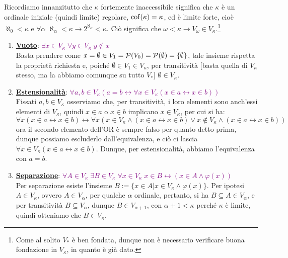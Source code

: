 \begin{soln}
	Ricordiamo innanzitutto che $\kappa$ fortemente inaccessibile significa che $\kappa$ è un ordinale iniziale (quindi limite) regolare, $\operatorname{cof}(\kappa) = \kappa$, ed è limite forte, cioè $\aleph_0 < \kappa$ e $\forall \alpha \; \aleph_\alpha < \kappa \to 2^{\aleph_\alpha} < \kappa$. Ciò significa che $\omega < \kappa \to V_\omega \in V_\kappa$.\footnote{Come al solito $V_*$ è ben fondata, dunque non è necessario verificare buona fondazione in $V_\kappa$, in quanto è già dato.}
	\begin{enumerate}[(1)]
		\item \textbf{\underline{Vuoto}}: \textcolor{purple}{$\exists x \in V_\kappa \; \forall y \in V_\kappa \; y \not \in x$} \\
		Basta prendere come $x = \emptyset \in V_1 = \mathcal{P}(V_0) = \mathcal{P}(\emptyset) = \{\emptyset\}$, tale insieme rispetta la proprietà richiesta e, poiché $\emptyset \in V_1 \in V_\kappa$, per transitività [basta quella di $V_\kappa$ stesso, ma la abbiamo comunque su tutto $V_*$] $\emptyset \in V_\kappa$.
		\item \textbf{\underline{Estensionalità}}: \textcolor{purple}{$\forall a,b \in V_\kappa (a = b \leftrightarrow \forall x \in V_\kappa (x \in a \leftrightarrow x \in b))$} \\
		Fissati $a,b \in V_\kappa$ osserviamo che, per transitività, i loro elementi sono anch'essi elementi di $V_\kappa$, quindi $x \in a$ o $x \in b$ implicano $x \in V_\kappa$, per cui si ha:
		\[ \forall x (x \in a \leftrightarrow x \in b) \leftrightarrow \forall x (x \in V_\kappa \land (x \in a \leftrightarrow x \in b) \lor x \not \in V_\kappa \land (x \in a \leftrightarrow x \in b))
			\] 
		ora il secondo elemento dell'OR è sempre falso per quanto detto prima, dunque possiamo escluderlo dall'equivalenza, e ciò ci lascia $\forall x \in V_\kappa (x \in a \leftrightarrow x \in b)$.
		Dunque, per estensionalità, abbiamo l'equivalenza con $a = b$.
		\item \textbf{\underline{Separazione}}: \textcolor{purple}{$\forall A \in V_\kappa \; \exists B \in V_\kappa \; \forall x \in V_\kappa \; x \in B \leftrightarrow (x \in A \land \varphi(x))$} \\
		Per separazione esiste l'insieme $B :=\{x \in A | x \in V_\kappa \land \varphi(x)\}$. Per ipotesi $A \in V_\kappa$, ovvero $A \in V_{\alpha}$, per qualche $\alpha$ ordinale, pertanto, si ha $B \subseteq A \in V_\alpha$, e per transitività $B \subseteq V_\alpha$, dunque $B \in V_{\alpha + 1}$, con $\alpha + 1 < \kappa$ perché $\kappa$ è limite, quindi otteniamo che $B \in V_\kappa$.

\end{enumerate}
\end{soln}
